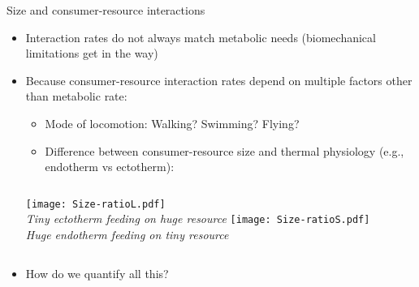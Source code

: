 \begin{frame}{Size and consumer-resource interactions}

  \begin{itemize}[<+->]\setlength{\itemindent}{-1em}
    \item Interaction rates do not always match metabolic needs (biomechanical limitations get in the way)
    \item Because consumer-resource interaction rates depend on multiple factors other than metabolic rate:
    \begin{itemize}[<+->] \setlength{\itemindent}{-1em}
      \item Mode of locomotion: Walking? Swimming? Flying?
      \item Difference between consumer-resource size and thermal	physiology (e.g., endotherm vs ectotherm):
    \end{itemize}
  \pause
  \begin{columns}[c]
    \centering
      \texttt{[image: Size-ratioL.pdf]}\\ {\small \it Tiny ectotherm feeding on huge resource}
    \centering
    \texttt{[image: Size-ratioS.pdf]}\\
    {\small \it Huge endotherm feeding on tiny resource}
  \end{columns}
  \item How do we quantify all this?
\end{itemize}
  
  \end{frame}
  
